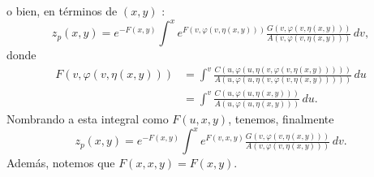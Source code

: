 \documentclass[11pt,letterpaper,draft]{report}
\theoremstyle{plain}
\theoremstyle{definition}
\theoremstyle{remark}
\newcommand\<{\langle}
\renewcommand\>{\rangle}
\renewcommand\phi\varphi
\begin{document}
o bien, en términos de \((x,y)\) :
\begin{equation}
  z_p(x,y)
  =
  e^{-F(x,y)}
    \int^x
    e^{F(v,\phi(v,\eta(x,y)))}
    \tfrac{G(v,\phi(v,\eta(x,y)))}{A(v,\phi(v,\eta(x,y)))} \,dv
,\end{equation}
donde
\begin{align}
  F(v,\phi(v,\eta(x,y)))
  &=
  \int^{v}
  \frac{C(u,\phi(u,\eta(v,\phi(v,\eta(x,y)))))}
  {A(u,\phi(u,\eta(v,\phi(v,\eta(x,y)))))} \,du \\
  &=
  \int^{v}
  \frac{C(u,\phi(u,\eta(x,y)))}
  {A(u,\phi(u,\eta(x,y)))} \,du
.\end{align}
Nombrando a esta integral como \(F(u,x,y)\), tenemos, finalmente
\begin{equation}
  z_p(x,y)
  =
  e^{-F(x,y)}
    \int^x
    e^{F(v,x,y)}
    \tfrac{G(v,\phi(v,\eta(x,y)))}{A(v,\phi(v,\eta(x,y)))} \,dv
.\end{equation}
Además, notemos que \(F(x,x,y)=F(x,y)\).
\end{document}
